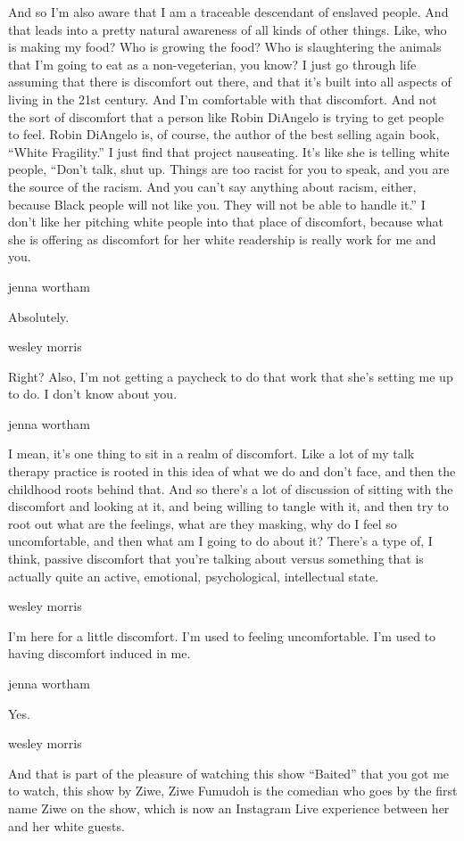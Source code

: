 And so I'm also aware that I am a traceable descendant of enslaved
people. And that leads into a pretty natural awareness of all kinds of
other things. Like, who is making my food? Who is growing the food? Who
is slaughtering the animals that I'm going to eat as a non-vegeterian,
you know? I just go through life assuming that there is discomfort out
there, and that it's built into all aspects of living in the 21st
century. And I'm comfortable with that discomfort. And not the sort of
discomfort that a person like Robin DiAngelo is trying to get people to
feel. Robin DiAngelo is, of course, the author of the best selling again
book, ``White Fragility.'' I just find that project nauseating. It's
like she is telling white people, ``Don't talk, shut up. Things are too
racist for you to speak, and you are the source of the racism. And you
can't say anything about racism, either, because Black people will not
like you. They will not be able to handle it.'' I don't like her
pitching white people into that place of discomfort, because what she is
offering as discomfort for her white readership is really work for me
and you.

jenna wortham

Absolutely.

wesley morris

Right? Also, I'm not getting a paycheck to do that work that she's
setting me up to do. I don't know about you.

jenna wortham

I mean, it's one thing to sit in a realm of discomfort. Like a lot of my
talk therapy practice is rooted in this idea of what we do and don't
face, and then the childhood roots behind that. And so there's a lot of
discussion of sitting with the discomfort and looking at it, and being
willing to tangle with it, and then try to root out what are the
feelings, what are they masking, why do I feel so uncomfortable, and
then what am I going to do about it? There's a type of, I think, passive
discomfort that you're talking about versus something that is actually
quite an active, emotional, psychological, intellectual state.

wesley morris

I'm here for a little discomfort. I'm used to feeling uncomfortable. I'm
used to having discomfort induced in me.

jenna wortham

Yes.

wesley morris

And that is part of the pleasure of watching this show ``Baited'' that
you got me to watch, this show by Ziwe, Ziwe Fumudoh is the comedian who
goes by the first name Ziwe on the show, which is now an Instagram Live
experience between her and her white guests.

